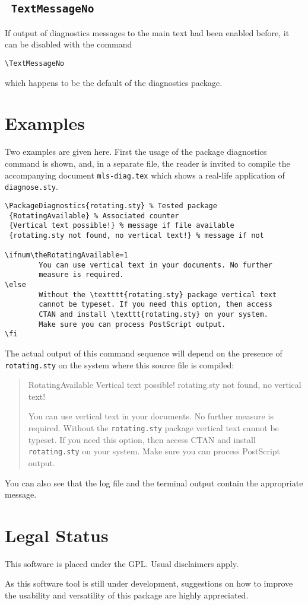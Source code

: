 \documentclass[10pt,a4paper]{article}
\begin{document}
\subsection{\texttt{ TextMessageNo}}

If output of diagnostics messages to the main text had been enabled
before, it can be disabled with the command
\begin{verbatim}
\TextMessageNo
\end{verbatim}
which happens to be the default of the diagnostics package.

\section{Examples}

Two examples are given here. First the usage of the package
diagnostics command is shown, and, in a separate file, the
reader is invited to compile the accompanying document 
\texttt{mls-diag.tex} which shows a real-life application of
\texttt{diagnose.sty}.

\begin{verbatim}
\PackageDiagnostics{rotating.sty} % Tested package
 {RotatingAvailable} % Associated counter
 {Vertical text possible!} % message if file available
 {rotating.sty not found, no vertical text!} % message if not

\ifnum\theRotatingAvailable=1
        You can use vertical text in your documents. No further
        measure is required.
\else
        Without the \textttt{rotating.sty} package vertical text
        cannot be typeset. If you need this option, then access
        CTAN and install \texttt{rotating.sty} on your system.
        Make sure you can process PostScript output.
\fi
\end{verbatim}

The actual output of this command sequence will depend on the
presence of \texttt{rotating.sty} on the system where this source
file is compiled:
\begin{quote}
 {RotatingAvailable} %
 {Vertical text possible!} %
 {rotating.sty not found, no vertical text!} %

\ifnum{}
	You can use vertical text in your documents. No further
	measure is required.
\else
	Without the \texttt{rotating.sty} package vertical text
	cannot be typeset. If you need this option, then access
	CTAN and install \texttt{rotating.sty} on your system.
	Make sure you can process PostScript output.
\fi
\end{quote}

You can also see that the log file and the terminal output contain
the appropriate message.

\section{Legal Status}

This software is placed under the GPL. Usual disclaimers apply.

As this software tool is still under development, suggestions on how
to improve the usability and versatility of this package are highly
appreciated.
\end{document}
